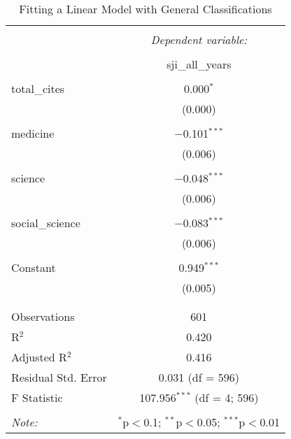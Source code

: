 \documentclass[12pt,english]{article}
\begin{document}
\begin{table}[!htbp] \centering 
  \caption{Fitting a Linear Model with General Classifications} 
  \label{tab:estimates_reclassified} 
\begin{tabular}{@{\extracolsep{5pt}}lc} 
\\[-1.8ex]\hline 
\hline \\[-1.8ex] 
 & \multicolumn{1}{c}{\textit{Dependent variable:}} \\ 
\cline{2-2} 
\\[-1.8ex] & sji\_all\_years \\ 
\hline \\[-1.8ex] 
 total\_cites & 0.000$^{*}$ \\ 
  & (0.000) \\ 
  & \\ 
 medicine & $-$0.101$^{***}$ \\ 
  & (0.006) \\ 
  & \\ 
 science & $-$0.048$^{***}$ \\ 
  & (0.006) \\ 
  & \\ 
 social\_science & $-$0.083$^{***}$ \\ 
  & (0.006) \\ 
  & \\ 
 Constant & 0.949$^{***}$ \\ 
  & (0.005) \\ 
  & \\ 
\hline \\[-1.8ex] 
Observations & 601 \\ 
R$^{2}$ & 0.420 \\ 
Adjusted R$^{2}$ & 0.416 \\ 
Residual Std. Error & 0.031 (df = 596) \\ 
F Statistic & 107.956$^{***}$ (df = 4; 596) \\ 
\hline 
\hline \\[-1.8ex] 
\textit{Note:}  & \multicolumn{1}{r}{$^{*}$p$<$0.1; $^{**}$p$<$0.05; $^{***}$p$<$0.01} \\ 
\end{tabular} 
\end{table} 
\end{document}
